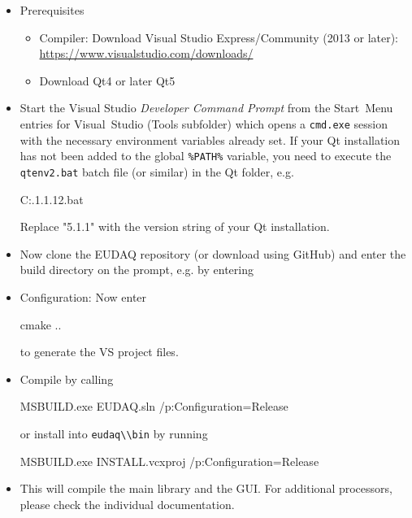 \begin{itemize}
\item Prerequisites 
\begin{itemize}
\item Compiler: Download Visual Studio Express/Community (2013 or later):
  \url{https://www.visualstudio.com/downloads/}
\item Download Qt4 or later Qt5
\end{itemize}

\item Start the Visual Studio \emph{Developer Command Prompt} from the
  Start~Menu entries for Visual~Studio (Tools subfolder) which opens a
  \texttt{cmd.exe} session with the necessary environment variables
  already set. If your Qt installation has not been added to the
  global \texttt{\%PATH\%} variable, you need to execute the \texttt{qtenv2.bat} batch file (or similar) in the Qt folder, e.g.
  \begin{listing}[mybash]
C:\Qt{}.1\5.1.1\bin\qtenv2.bat
\end{listing}
Replace "5.1.1" with the version string of your Qt installation.

\item Now clone the EUDAQ repository (or download using GitHub) and enter the build directory on the prompt, e.g. by entering
  \begin{listing}[mybash]
cd c:\Users\[username]\Documents\GitHub\eudaq\build
\end{listing}

\item Configuration: Now enter
  \begin{listing}[mybash]
cmake ..
\end{listing}
to generate the VS project files.

\item Compile by calling
  \begin{listing}[mybash]
MSBUILD.exe EUDAQ.sln /p:Configuration=Release
\end{listing}
or install into \texttt{\lstinline{eudaq\\bin}} by running
  \begin{listing}[mybash]
MSBUILD.exe INSTALL.vcxproj /p:Configuration=Release
\end{listing}
\item This will compile the main library and the GUI. For additional processors, please check the individual documentation.
\end{itemize}
